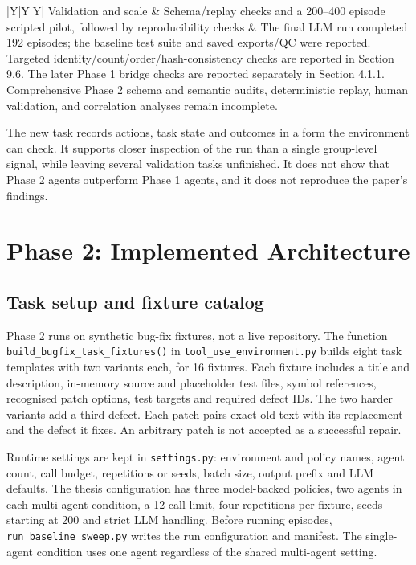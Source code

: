 \documentclass[12pt,a4paper,oneside]{report}
\begin{document}
\begin{table}[htbp]
\begin{tabularx}{\linewidth}{|Y|Y|Y|}
\hline
Validation and scale & Schema/replay checks and a 200–400 episode scripted pilot, followed by reproducibility checks & The final LLM run completed 192 episodes; the baseline test suite and saved exports/QC were reported. Targeted identity/count/order/hash-consistency checks are reported in Section 9.6. The later Phase 1 bridge checks are reported separately in Section 4.1.1. Comprehensive Phase 2 schema and semantic audits, deterministic replay, human validation, and correlation analyses remain incomplete. \\
\hline
\end{tabularx}
\caption{Planned and completed Phase 2 work}
\end{table}
The new task records actions, task state and outcomes in a form the environment can check. It supports closer inspection of the run than a single group-level signal, while leaving several validation tasks unfinished. It does not show that Phase 2 agents outperform Phase 1 agents, and it does not reproduce the paper’s findings.

\chapter{Phase 2: Implemented Architecture}
\label{chapter-05}
\thispagestyle{plain}
\section{Task setup and fixture catalog}
Phase 2 runs on synthetic bug-fix fixtures, not a live repository. The function \texttt{build\allowbreak\_bugfix\allowbreak\_task\allowbreak\_fixtures()} in \texttt{tool\allowbreak\_use\allowbreak\_environment.py} builds eight task templates with two variants each, for 16 fixtures. Each fixture includes a title and description, in-memory source and placeholder test files, symbol references, recognised patch options, test targets and required defect IDs. The two harder variants add a third defect. Each patch pairs exact old text with its replacement and the defect it fixes. An arbitrary patch is not accepted as a successful repair.

Runtime settings are kept in \texttt{settings.py}: environment and policy names, agent count, call budget, repetitions or seeds, batch size, output prefix and LLM defaults. The thesis configuration has three model-backed policies, two agents in each multi-agent condition, a 12-call limit, four repetitions per fixture, seeds starting at 200 and strict LLM handling. Before running episodes, \texttt{run\allowbreak\_baseline\allowbreak\_sweep.py} writes the run configuration and manifest. The single-agent condition uses one agent regardless of the shared multi-agent setting.
\end{document}
